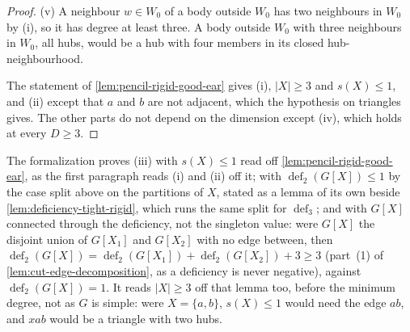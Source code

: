 \begin{proof}
  (v) A neighbour $w \in W_0$ of a body outside $W_0$ has two neighbours
  in $W_0$ by (i), so it has degree at least three. A body outside $W_0$
  with three neighbours in $W_0$, all hubs, would be a hub with four
  members in its closed hub-neighbourhood.

  The statement of \cref{lem:pencil-rigid-good-ear} gives (i), $|X| \ge 3$
  and $s(X) \le 1$, and (ii) except that $a$ and $b$ are not adjacent,
  which the hypothesis on triangles gives. The other parts do not depend
  on the dimension except (iv), which holds at every $D \ge 3$.
\end{proof}

\begin{fmlnote}
  The formalization proves (iii) with $s(X) \le 1$ read off
  \cref{lem:pencil-rigid-good-ear}, as the first paragraph reads (i) and
  (ii) off it; with $\operatorname{def}_2(G[X]) \le 1$ by the case split
  above on the partitions of $X$, stated as a lemma of its own beside
  \cref{lem:deficiency-tight-rigid}, which runs the same split for
  $\operatorname{def}_3$; and with $G[X]$ connected through the
  deficiency, not the singleton value: were $G[X]$ the disjoint union of
  $G[X_1]$ and $G[X_2]$ with no edge between, then
  $\operatorname{def}_2(G[X]) = \operatorname{def}_2(G[X_1]) +
  \operatorname{def}_2(G[X_2]) + 3 \ge 3$ (part~(1) of
  \cref{lem:cut-edge-decomposition}, as a deficiency is never negative),
  against $\operatorname{def}_2(G[X]) = 1$. It reads $|X| \ge 3$ off that
  lemma too, before the minimum degree, not as $G$ is simple: were
  $X = \{a, b\}$, $s(X) \le 1$ would need the edge $ab$, and $x a b$
  would be a triangle with two hubs.
\end{fmlnote}

